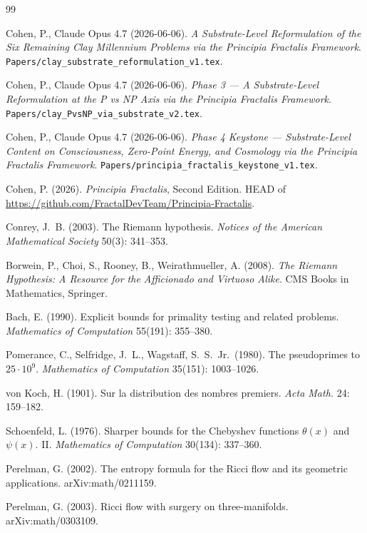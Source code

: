 \documentclass[11pt,a4paper]{article}
\theoremstyle{plain}
\theoremstyle{definition}
\begin{document}
\begin{thebibliography}{99}

Cohen, P., Claude Opus 4.7 (2026-06-06). \emph{A Substrate-Level
Reformulation of the Six Remaining Clay Millennium Problems via the
Principia Fractalis Framework}.
\texttt{Papers/clay\_substrate\_reformulation\_v1.tex}.

Cohen, P., Claude Opus 4.7 (2026-06-06). \emph{Phase 3 ---
A Substrate-Level Reformulation at the P vs NP Axis via the
Principia Fractalis Framework}.
\texttt{Papers/clay\_PvsNP\_via\_substrate\_v2.tex}.

Cohen, P., Claude Opus 4.7 (2026-06-06). \emph{Phase 4 Keystone ---
Substrate-Level Content on Consciousness, Zero-Point Energy, and
Cosmology via the Principia Fractalis Framework}.
\texttt{Papers/principia\_fractalis\_keystone\_v1.tex}.

Cohen, P. (2026). \emph{Principia Fractalis}, Second Edition.
HEAD of
\url{https://github.com/FractalDevTeam/Principia-Fractalis}.

Conrey, J.~B. (2003). The Riemann hypothesis. \emph{Notices of the
American Mathematical Society} 50(3): 341--353.

Borwein, P., Choi, S., Rooney, B., Weirathmueller, A. (2008).
\emph{The Riemann Hypothesis: A Resource for the Afficionado and
Virtuoso Alike}. CMS Books in Mathematics, Springer.

Bach, E. (1990). Explicit bounds for primality testing and related
problems. \emph{Mathematics of Computation} 55(191): 355--380.

Pomerance, C., Selfridge, J.~L., Wagstaff, S.~S.~Jr.~(1980). The
pseudoprimes to $25 \cdot 10^{9}$. \emph{Mathematics of Computation}
35(151): 1003--1026.

von Koch, H. (1901). Sur la distribution des nombres premiers.
\emph{Acta Math.} 24: 159--182.

Schoenfeld, L. (1976). Sharper bounds for the Chebyshev functions
$\theta(x)$ and $\psi(x)$. II. \emph{Mathematics of Computation}
30(134): 337--360.

Perelman, G. (2002). The entropy formula for the Ricci flow and its
geometric applications. arXiv:math/0211159.

Perelman, G. (2003). Ricci flow with surgery on three-manifolds.
arXiv:math/0303109.


\end{thebibliography}
\end{document}
